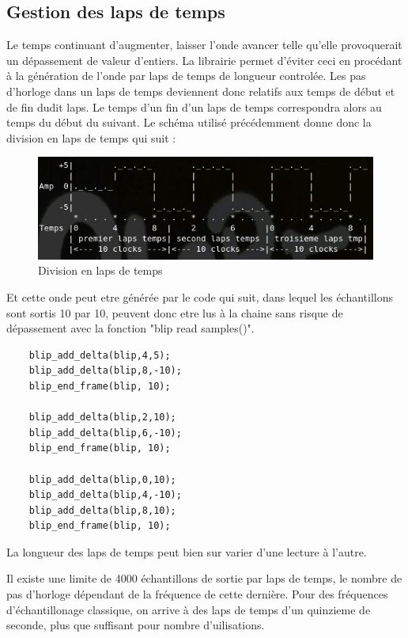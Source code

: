 \documentclass{report}
\begin{document}
\subsection{Gestion des laps de temps}
Le temps continuant d'augmenter, laisser l'onde avancer telle qu'elle provoquerait un dépassement de valeur d'entiers. 
La librairie permet d'éviter ceci en procédant à la génération de l'onde par laps de temps de longueur controlée.
Les pas d'horloge dans un laps de temps deviennent donc relatifs aux temps de début et de fin dudit laps.
Le temps d'un fin d'un laps de temps correspondra alors au temps du début du suivant.
Le schéma utilisé précédemment donne donc la division en laps de temps qui suit :

\begin{figure}[h]
\centering
\includegraphics[scale=0.5]{images/Wave3.jpg}
\caption{Division en laps de temps}
\label{WAV3}
\end{figure}

Et cette onde peut etre générée par le code qui suit, dans lequel les échantillons sont sortis 10 par 10, peuvent donc etre lus à la chaine sans risque de dépassement avec la fonction "blip read samples()".

\begin{lstlisting}
	blip_add_delta(blip,4,5);
	blip_add_delta(blip,8,-10);
	blip_end_frame(blip, 10);
	
	blip_add_delta(blip,2,10);
	blip_add_delta(blip,6,-10);
	blip_end_frame(blip, 10);
	
	blip_add_delta(blip,0,10);
	blip_add_delta(blip,4,-10);
	blip_add_delta(blip,8,10);
	blip_end_frame(blip, 10);
\end{lstlisting}

La longueur des laps de temps peut bien sur varier d'une lecture à l'autre.

Il existe une limite de 4000 échantillons de sortie par laps de temps, le nombre de pas d'horloge dépendant de la fréquence de cette dernière.
Pour des fréquences d'échantillonage classique, on arrive à des laps de temps d'un quinzieme de seconde, plus que suffisant pour nombre d'uilisations.
\end{document}
